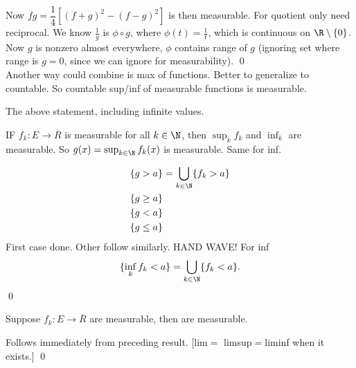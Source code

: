 Now $fg= \dfrac{1}{4} \left[ (f+g)^2 - (f-g)^2 \right]$ is then measurable. For quotient only need reciprocal. We know $\frac{1}{g}$ is $\phi \circ g$, where $\phi(t)=\frac{1}{t}$, which is continuous on $\R \setminus \{0\}$. Now $g$ is nonzero almost everywhere, $\phi$ contains range of $g$ (ignoring set where range is $g=0$, since we can ignore for measurability). \qed \\



Another way could combine is max of functions. Better to generalize to countable. So countable sup/inf of measurable functions is measurable.

\begin{thm}
The above statement, including infinite values. 
\end{thm}

\pf IF $f_k: E \to \overline{R}$ is measurable for all $k \in \N$, then $\sup_k f_k$ and $\inf_k$ are measurable. So $g(x)= \sup_{k \in \N} f_k(x)$ is measurable. Same for inf. 


	\[
	\begin{split}
	\{g>a\}&= \bigcup_{k \in \N} \{f_k>a\} \\
	\{g \geq a\}& \\
	\{g<a\}& \\
	\{g \leq a\}& \\
	\end{split}
	\]
First case done. Other follow similarly. HAND WAVE! For inf
	\[
	\{ \inf_k f_k<a\}= \bigcup_{k \in \N} \{f_k<a\}.
	\]
\qed \\





\begin{thm}
Suppose $f_k: E \to \overline{R}$ are measurable, then
are measurable. 
\end{thm}

\pf Follows immediately from preceding result. [lim$=$ limsup$=$liminf when it exists.] \qed \\










